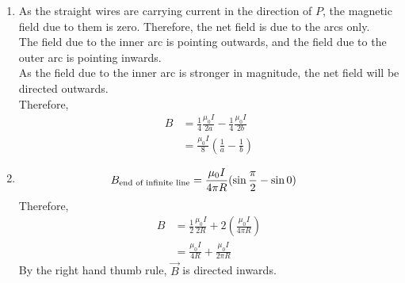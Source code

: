 \documentclass[fleqn, a4paper, 11pt, oneside]{amsart}
\theoremstyle{definition}
\theoremstyle{theorem}
\begin{document}
\begin{solution}
	\begin{enumerate}[leftmargin = *]
		\item
			As the straight wires are carrying current in the direction of $P$, the magnetic field due to them is zero.
			Therefore, the net field is due to the arcs only.\\
			The field due to the inner arc is pointing outwards, and the field due to the outer arc is pointing inwards.\\
			As the field due to the inner arc is stronger in magnitude, the net field will be directed outwards.\\
			Therefore,
			\begin{align*}
				B &= \frac{1}{4} \frac{\mu_0 I}{2 a} - \frac{1}{4} \frac{\mu_0 I}{2 b}\\
				&= \frac{\mu_0 I}{8} \left( \frac{1}{a} - \frac{1}{b} \right)
			\end{align*}
		\item
			\begin{align*}
				B_{\textnormal{end of infinite line}} &= \frac{\mu_0 I}{4 \pi R} (\sin \frac{\pi}{2} - \sin 0)
			\end{align*}
			Therefore,
			\begin{align*}
				B &= \frac{1}{2} \frac{\mu_0 I}{2 R} + 2 \left( \frac{\mu_0 I}{4 \pi R} \right)\\
				&= \frac{\mu_0 I}{4 R} + \frac{\mu_0 I}{2 \pi R}
			\end{align*}
			By the right hand thumb rule, $\overrightarrow{B}$ is directed inwards.
	\end{enumerate}
\end{solution}
\end{document}
